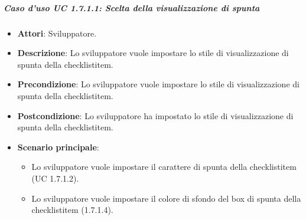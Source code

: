 \subparagraph{Caso d'uso UC 1.7.1.1: Scelta della visualizzazione di spunta}

\FloatBarrier
\begin{itemize}
\item\textbf{Attori}: Sviluppatore.
\item\textbf{Descrizione}: Lo sviluppatore vuole impostare lo stile di visualizzazione di spunta della checklistitem.
\item\textbf{Precondizione}: Lo sviluppatore vuole impostare lo stile di visualizzazione di spunta della checklistitem.
\item\textbf{Postcondizione}: Lo sviluppatore ha impostato lo stile di visualizzazione di spunta della checklistitem.
\item\textbf{Scenario principale}: 
\begin{itemize}
	\item Lo sviluppatore vuole impostare il carattere di spunta della checklistitem (UC 1.7.1.2).
	\item Lo sviluppatore vuole impostare il colore di sfondo del box di spunta della checklistitem (1.7.1.4).
\end{itemize}
\end{itemize}